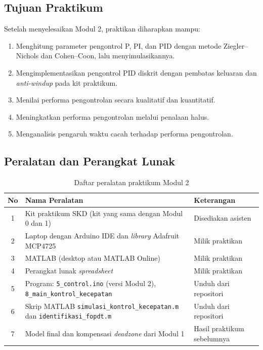 \documentclass[11pt,a4paper]{article}
\newcommand{\prog}[1]{\texttt{#1}}
\begin{document}
\subsection{Tujuan Praktikum}
Setelah menyelesaikan Modul 2, praktikan diharapkan mampu:
\begin{enumerate}
\item Menghitung parameter pengontrol P, PI, dan PID dengan metode Ziegler--Nichols dan Cohen--Coon, lalu menyimulasikannya.
\item Mengimplementasikan pengontrol PID diskrit dengan pembatas keluaran dan \textit{anti-windup} pada kit praktikum.
\item Menilai performa pengontrolan secara kualitatif dan kuantitatif.
\item Meningkatkan performa pengontrolan melalui penalaan halus.
\item Menganalisis pengaruh waktu cacah terhadap performa pengontrolan.
\end{enumerate}

\subsection{Peralatan dan Perangkat Lunak}
\begin{table}[H]
\centering
\caption{Daftar peralatan praktikum Modul 2}
\label{tab:peralatan}
\begin{tabularx}{\textwidth}{|c|X|l|}
\hline
\textbf{No} & \textbf{Nama Peralatan} & \textbf{Keterangan} \\
\hline
1 & Kit praktikum SKD (kit yang sama dengan Modul 0 dan 1) & Disediakan asisten \\
2 & Laptop dengan Arduino IDE dan \textit{library} Adafruit MCP4725 & Milik praktikan \\
3 & MATLAB (desktop atau MATLAB Online) & Milik praktikan \\
4 & Perangkat lunak \textit{spreadsheet} & Milik praktikan \\
5 & Program: \prog{5\_control.ino} (versi Modul 2), \prog{8\_main\_kontrol\_kecepatan} & Unduh dari repositori \\
6 & Skrip MATLAB \prog{simulasi\_kontrol\_kecepatan.m} dan \prog{identifikasi\_fopdt.m} & Unduh dari repositori \\
7 & Model final dan kompensasi \textit{deadzone} dari Modul 1 & Hasil praktikum sebelumnya \\
\hline
\end{tabularx}
\end{table}
\end{document}
